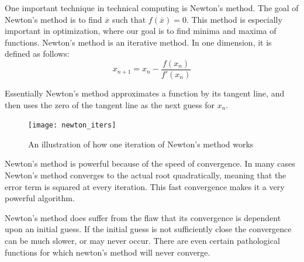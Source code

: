 \label{lab:NewtonsMethod}

One important technique in technical computing is Newton's method.
The goal of Newton's method is to find $\overline{x}$ such that $f\left(\overline{x}\right) = 0$.
This method is especially important in optimization, where our goal is to find minima and maxima of functions.
Newton's method is an iterative method.
In one dimension, it is defined as follows:
\[
x_{n+1} = x_n - \frac{f(x_n)}{f'(x_n)}
\]

Essentially Newton's method approximates a function by its tangent line, and then uses the zero of the tangent line as the next guess for $x_n$.

\begin{figure}[h]
\centering
\texttt{[image: newton\_iters]}
\caption{An illustration of how one iteration of Newton's method works}
\end{figure}

Newton's method is powerful because of the speed of convergence.
In many cases Newton's method converges to the actual root quadratically, meaning that the error term is squared at every iteration.
This fast convergence makes it a very powerful algorithm.

Newton's method does suffer from the flaw that its convergence is dependent upon an initial guess.
If the initial guess is not sufficiently close the convergence can be much slower, or may never occur.
There are even certain pathological functions for which newton's method will never converge.

